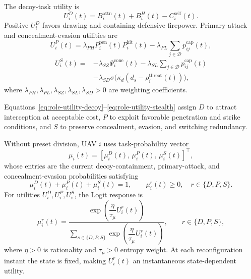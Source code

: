 \documentclass{cja}
\begin{document}
The decoy-task utility is
\begin{equation}
U_i^{D}(t)
=
B_i^{\mathrm{attn}}(t)
+
B_i^{H}(t)
-
C_i^{\mathrm{self}}(t).
\label{eq:role-utility-decoy}
\end{equation}
Positive $U_i^{D}$ favors drawing and containing defensive firepower. Primary-attack and concealment-evasion utilities are
\begin{equation}
U_i^{P}(t)
=
\lambda_{PH}P_i^{\mathrm{pen}}(t)P_i^{\mathrm{hit}}(t)
-
\lambda_{PL}\sum_{j\in\mathcal D}p_{ij}^{\mathrm{cap}}(t),
\label{eq:role-utility-pen}
\end{equation}
\begin{equation}
\begin{aligned}
U_i^{S}(t)
={}&
-\lambda_{SZ}\Psi_i^{\mathrm{cone}}(t)
-\lambda_{SL}\sum_{j\in\mathcal D}p_{ij}^{\mathrm{cap}}(t)\\
&-\lambda_{SD}\sigma\!\bigl(\kappa_d(d_s-\rho_i^{\mathrm{threat}}(t))\bigr),
\end{aligned}
\label{eq:role-utility-stealth}
\end{equation}
where $\lambda_{PH},\lambda_{PL},\lambda_{SZ},\lambda_{SL},\lambda_{SD}>0$ are weighting coefficients.

Equations~\eqref{eq:role-utility-decoy}--\eqref{eq:role-utility-stealth} assign $D$ to attract interception at acceptable cost, $P$ to exploit favorable penetration and strike conditions, and $S$ to preserve concealment, evasion, and switching redundancy.

Without preset division, UAV $i$ uses task-probability vector
\begin{equation}
\mu_i(t)=
\left[
\mu_i^{D}(t),\,
\mu_i^{P}(t),\,
\mu_i^{S}(t)
\right]^{\top},
\end{equation}
whose entries are the current decoy-containment, primary-attack, and concealment-evasion probabilities satisfying
\begin{equation}
\mu_i^{D}(t)+\mu_i^{P}(t)+\mu_i^{S}(t)=1,\qquad
\mu_i^{r}(t)\ge 0,\quad r\in\{D,P,S\}.
\end{equation}
For utilities $U_i^{D},U_i^{P},U_i^{S}$, the Logit response is
\begin{equation}
\mu_i^{r}(t)
=
\frac{\exp\!\left(\dfrac{\eta}{\tau_\mu}U_i^{r}(t)\right)}
{\sum\limits_{s\in\{D,P,S\}}\exp\!\left(\dfrac{\eta}{\tau_\mu}U_i^{s}(t)\right)},
\qquad r\in\{D,P,S\},
\label{eq:role-logit}
\end{equation}
where $\eta>0$ is rationality and $\tau_\mu>0$ entropy weight. At each reconfiguration instant the state is fixed, making $U_i^r(t)$ an instantaneous state-dependent utility.
\end{document}
